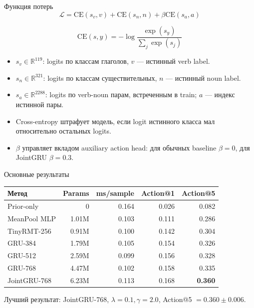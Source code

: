 \documentclass[aspectratio=169,10pt]{beamer}
\begin{document}
\begin{frame}{Функция потерь}
    \[
        \mathcal{L} =
        \mathrm{CE}(s_v, v)
        + \mathrm{CE}(s_n, n)
        + \beta \mathrm{CE}(s_a, a)
    \]

    \vspace{-0.1cm}
    \[
        \mathrm{CE}(s, y) = - \log
        \frac{\exp(s_y)}{\sum_j \exp(s_j)}
    \]

    \begin{itemize}
        \item \(s_v \in \mathbb{R}^{119}\): logits по классам глаголов, \(v\) --- истинный verb label.
        \item \(s_n \in \mathbb{R}^{321}\): logits по классам существительных, \(n\) --- истинный noun label.
        \item \(s_a \in \mathbb{R}^{2288}\): logits по verb-noun парам, встреченным в train; \(a\) --- индекс истинной пары.
        \item Cross-entropy штрафует модель, если logit истинного класса мал относительно остальных logits.
        \item \(\beta\) управляет вкладом auxiliary action head: для обычных baseline \(\beta=0\), для JointGRU \(\beta=0.3\).
    \end{itemize}
\end{frame}

\begin{frame}{Основные результаты}
    \begin{table}
        \centering
        \small
        \begin{tabular}{lrrrr}
            \toprule
            Метод & Params & ms/sample & Action@1 & Action@5 \\
            \midrule
            Prior-only & 0 & 0.164 & 0.026 & 0.082 \\
            MeanPool MLP & 1.01M & 0.103 & 0.111 & 0.286 \\
            TinyRMT-256 & 0.91M & 0.100 & 0.142 & 0.304 \\
            GRU-384 & 1.79M & 0.105 & 0.154 & 0.326 \\
            GRU-512 & 2.59M & 0.099 & 0.156 & 0.328 \\
            GRU-768 & 4.47M & 0.102 & 0.158 & 0.335 \\
            JointGRU-768 & 6.23M & 0.113 & 0.168 & \textbf{0.360} \\
            \bottomrule
        \end{tabular}
    \end{table}

    \vspace{0.2cm}
    Лучший результат: JointGRU-768, \( \lambda=0.1, \gamma=2.0 \), Action@5 \(=0.360 \pm 0.006\).
\end{frame}
\end{document}
